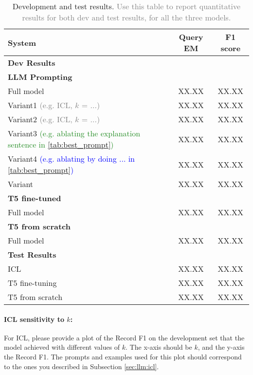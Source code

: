 \documentclass{article}
\begin{document}
\begin{table}[h!]
\centering
\begin{tabular}{lcc}
  \toprule
  System & Query EM & F1 score\\
  \midrule
  \multicolumn{3}{l}{\textbf{Dev Results}} \\
  \midrule
  \multicolumn{3}{l}{\textbf{LLM Prompting}} \\
  Full model & XX.XX & XX.XX \\ 
  Variant1 \textcolor{gray}{(e.g. ICL, $k$ = $...$)} & XX.XX & XX.XX \\
  Variant2 \textcolor{gray}{(e.g. ICL, $k$ = $...$)} & XX.XX & XX.XX \\
  Variant3 \textcolor{ForestGreen}{(e.g. ablating the explanation sentence in \autoref{tab:best_prompt})} & XX.XX & XX.XX \\
  Variant4 \textcolor{Blue}{(e.g. ablating by doing ... in \autoref{tab:best_prompt})} & XX.XX & XX.XX \\
  Variant & XX.XX & XX.XX \\[5pt]
  \multicolumn{3}{l}{\textbf{T5 fine-tuned}} \\
  Full model & XX.XX & XX.XX \\[5pt]
  \multicolumn{3}{l}{\textbf{T5 from scratch}} \\
  Full model & XX.XX & XX.XX \\ 
  \midrule
  \multicolumn{3}{l}{\textbf{Test Results}} \\
  \midrule
  ICL & XX.XX & XX.XX \\ 
  T5 fine-tuning & XX.XX & XX.XX \\
  T5 from scratch & XX.XX & XX.XX \\
  \bottomrule
\end{tabular}  
\caption{Development and test results. \textcolor{gray}{Use this table to report quantitative results for both dev and test results, for all the three models.}}
\label{tab:results}
\end{table}


\paragraph{ICL sensitivity to $k$:} For ICL, please provide a plot of the Record F1 on the development set that the model achieved with different values of $k$. The x-axis should be $k$, and the y-axis the Record F1. The prompts and examples used for this plot should correspond to the ones you described in Subsection \ref{sec:llm:icl}.
\end{document}
